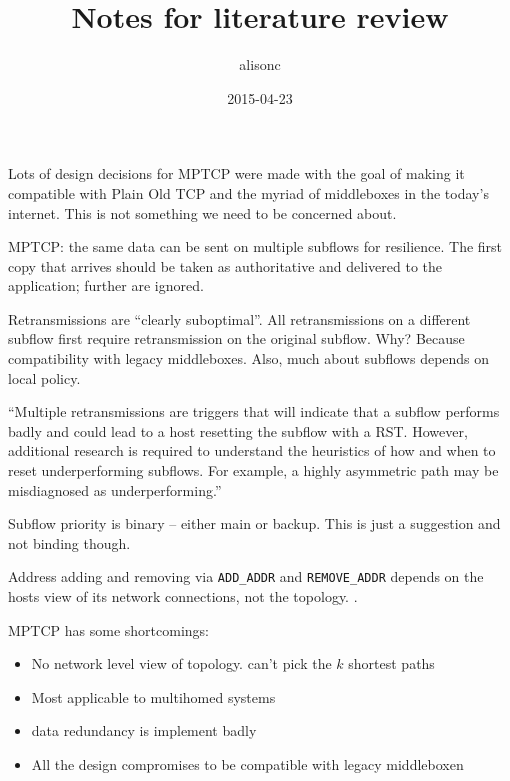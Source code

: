 \documentclass{article}
\author{alisonc}
\title{Notes for literature review}
\date{2015-04-23}
\begin{document}
\maketitle

Lots of design decisions for MPTCP were made with the goal of making it 
compatible with Plain Old TCP and the myriad of middleboxes in the today's 
internet. This is not something we need to be concerned about. \cite{rfc6824}

MPTCP: the same data can be sent on multiple subflows for resilience. The first 
copy that arrives should be taken as authoritative and delivered to the application;
further are ignored. \cite[p.~25]{rfc6824}

Retransmissions are ``clearly suboptimal''. All retransmissions on a different subflow 
first require retransmission on the original subflow. Why? Because compatibility with
legacy middleboxes. \cite[\S~3.3.6]{rfc6824} Also, much about subflows depends on local policy. 
\cite[\S~3.3.8]{rfc6824}

``Multiple retransmissions are triggers that will indicate that a
subflow performs badly and could lead to a host resetting the subflow
with a RST.  However, additional research is required to understand
the heuristics of how and when to reset underperforming subflows.
For example, a highly asymmetric path may be misdiagnosed as
underperforming.'' \cite[p.~33]{rfc6824}

Subflow priority is binary -- either main or backup. This is just a suggestion and
not binding though.

Address adding and removing via \texttt{ADD\_ADDR} and \texttt{REMOVE\_ADDR} depends 
on the hosts view of its network connections, not the topology. \cite[\S~3.4]{rfc6824}.

MPTCP has some shortcomings:
\begin{itemize}
  \item No network level view of topology. can't pick the $k$ shortest paths
  \item Most applicable to multihomed systems
  \item data redundancy is implement badly
  \item All the design compromises to be compatible with legacy middleboxen
\end{itemize}



\end{document}

